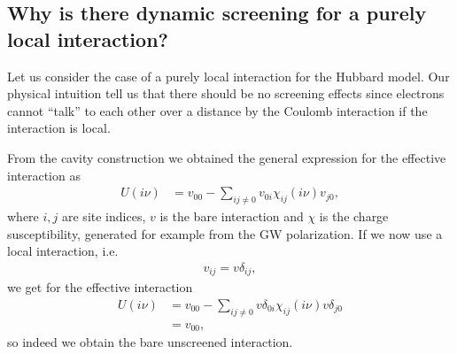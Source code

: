\documentclass[12pt,a4paper]{scrartcl}
\numberwithin{equation}{section}
\begin{document}
 \clearpage


\subsection{Why is there dynamic screening for a purely local interaction?}
Let us consider the case of a purely local interaction for the Hubbard model.
Our physical intuition tell us that
there should be no screening effects since electrons cannot 
``talk'' to each other over a distance by the Coulomb interaction
if the interaction is local.

From the cavity construction we obtained the general expression for the 
effective interaction as
\begin{align}
 U(i\nu) 
 &= v_{00} - \sum_{ij\neq 0} v_{0i} \chi_{ij}(i\nu) v_{j0},
\end{align}
where $i,j$ are site indices, $v$ is the bare interaction and $\chi$
is the charge susceptibility, generated for example from the GW polarization.
If we now use a local interaction, i.e.
\begin{align}
 v_{ij} = v \delta_{ij}, 
\end{align}
we get for the effective interaction
\begin{align}
 U(i\nu) 
 &= v_{00} - \sum_{ij\neq 0} v \delta_{0i} \chi_{ij}(i\nu) v \delta_{j0} \\
 &= v_{00},
\end{align}
 so indeed we obtain the bare unscreened interaction. 
 
\end{document}
